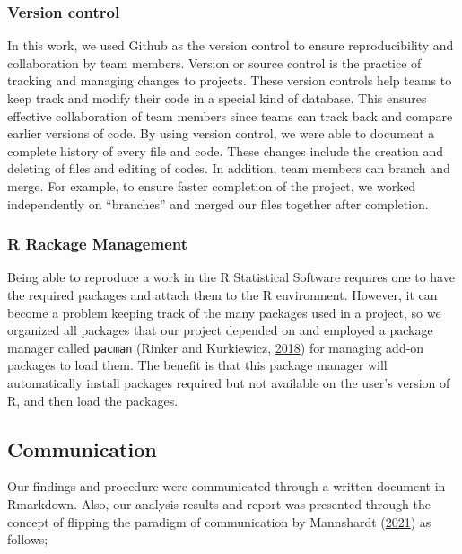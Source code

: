 \documentclass[
  10pt,
]{article}
\begin{document}
\hypertarget{version-control}{%
\subsubsection{Version control}\label{version-control}}

In this work, we used Github as the version control to ensure reproducibility and collaboration by team members. Version or source control is the practice of tracking and managing changes to projects. These version controls help teams to keep track and modify their code in a special kind of database. This ensures effective collaboration of team members since teams can track back and compare earlier versions of code. By using version control, we were able to document a complete history of every file and code. These changes include the creation and deleting of files and editing of codes. In addition, team members can branch and merge. For example, to ensure faster completion of the project, we worked independently on ``branches'' and merged our files together after completion.

\hypertarget{r-rackage-management}{%
\subsubsection{R Rackage Management}\label{r-rackage-management}}

Being able to reproduce a work in the R Statistical Software requires one to have the required packages and attach them to the R environment. However, it can become a problem keeping track of the many packages used in a project, so we organized all packages that our project depended on and employed a package manager called \texttt{pacman} (Rinker and Kurkiewicz, \protect\hyperlink{ref-pacman}{2018}) for managing add-on packages to load them. The benefit is that this package manager will automatically install packages required but not available on the user's version of R, and then load the packages.

\hypertarget{communication}{%
\subsection{Communication}\label{communication}}

Our findings and procedure were communicated through a written document in Rmarkdown. Also, our analysis results and report was presented through the concept of flipping the paradigm of communication by Mannshardt (\protect\hyperlink{ref-elizabeth_flip}{2021}) as follows;
\end{document}

